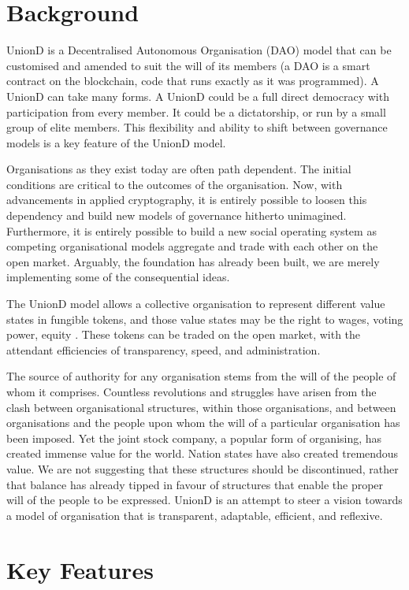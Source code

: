 \documentclass[12pt,twocolumn]{article}
\begin{document}
\section {Background}

UnionD is a Decentralised Autonomous Organisation (DAO) model that can be customised and amended to suit the will of its members (a DAO is a smart contract on the blockchain, code that runs exactly as it was programmed). 
A UnionD can take many forms. A UnionD could be a full direct democracy with participation from every member. It could be a dictatorship, or run by a small group of elite members. This flexibility and ability to shift between governance models is a key feature of the UnionD model.

Organisations as they exist today are often path dependent. The initial conditions are critical to the outcomes of the organisation. Now, with advancements in applied cryptography, it is entirely possible to loosen this dependency and build new models of governance hitherto unimagined. Furthermore, it is entirely possible to build a new social operating system as competing organisational models aggregate and trade with each other on the open market. Arguably, the foundation has already been built, we are merely implementing some of the consequential ideas.

The UnionD model allows a collective organisation to represent different value states in fungible tokens, and those value states may be the right to wages, voting power, equity . These tokens can be traded on the open market, with the attendant efficiencies of transparency, speed, and administration.

The source of authority for any organisation stems from the will of the people of whom it comprises. Countless revolutions and struggles have arisen from the clash between organisational structures, within those organisations, and between organisations and the people upon whom the will of a particular organisation has been imposed. Yet the joint stock company, a popular form of organising, has created immense value for the world. Nation states have also created tremendous value. We are not suggesting that these structures should be discontinued, rather that balance has already tipped in favour of structures that enable the proper will of the people to be expressed. UnionD is an attempt to steer a vision towards a model of organisation that is transparent, adaptable, efficient, and reflexive.

\section {Key Features}
\end{document}
